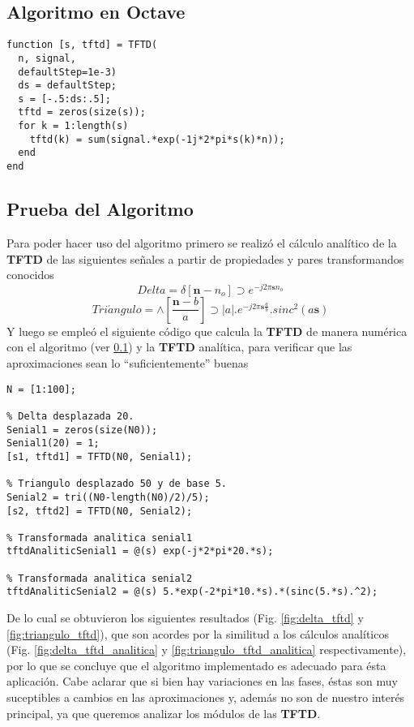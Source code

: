 \documentclass[letterpaper, 10 pt, conference]{ieeeconf}  %
\begin{document}
\subsection{Algoritmo en Octave}
\label{tftd_function}
\nopagebreak
\begin{lstlisting}[style=Matlab-editor] 
function [s, tftd] = TFTD(
  n, signal,
  defaultStep=1e-3)
  ds = defaultStep;
  s = [-.5:ds:.5];
  tftd = zeros(size(s));
  for k = 1:length(s)
    tftd(k) = sum(signal.*exp(-1j*2*pi*s(k)*n));
  end
end
\end{lstlisting}

\subsection{Prueba del Algoritmo}
Para poder hacer uso del algoritmo primero se realiz\'o el c\'alculo analítico de la \textbf{TFTD} de las siguientes se\~{n}ales a partir de propiedades y pares transformandos conocidos
\[
  Delta = \delta[\textbf{n}-n_o] \supset e^{-j2{\pi}\textbf{s}n_o}
\]
\[
  Tri\acute{a}ngulo = \wedge[\frac{\textbf{n}-b}{a}] \supset |a|.e^{-j2{\pi}\textbf{s}\frac{a}{b}}.sinc^2(a\textbf{s})
\]
Y luego se emple\'o el siguiente c\'odigo que calcula la \textbf{TFTD} de manera num\'erica con el algoritmo (ver \ref{tftd_function}) y la \textbf{TFTD} anal\'itica, para verificar que las aproximaciones sean lo ``suficientemente'' buenas

\begin{lstlisting}[style=Matlab-editor]
N = [1:100];

% Delta desplazada 20.
Senial1 = zeros(size(N0));
Senial1(20) = 1;
[s1, tftd1] = TFTD(N0, Senial1);

% Triangulo desplazado 50 y de base 5.
Senial2 = tri((N0-length(N0)/2)/5);
[s2, tftd2] = TFTD(N0, Senial2);

% Transformada analitica senial1
tftdAnaliticSenial1 = @(s) exp(-j*2*pi*20.*s);

% Transformada analitica senial2
tftdAnaliticSenial2 = @(s) 5.*exp(-2*pi*10.*s).*(sinc(5.*s).^2);

\end{lstlisting}

De lo cual se obtuvieron los siguientes resultados (Fig. \ref{fig:delta_tftd} y \ref{fig:triangulo_tftd}), que son acordes por la similitud a los c\'alculos analíticos (Fig. \ref{fig:delta_tftd_analitica} y \ref{fig:triangulo_tftd_analitica} respectivamente), por lo que se concluye que el algoritmo implementado es adecuado para \'esta aplicaci\'on. Cabe aclarar que si bien hay variaciones en las fases, \'estas son muy suceptibles a cambios en las aproximaciones y, adem\'as no son de nuestro inter\'es principal, ya que queremos analizar los m\'odulos de las \textbf{TFTD}.
\end{document}
